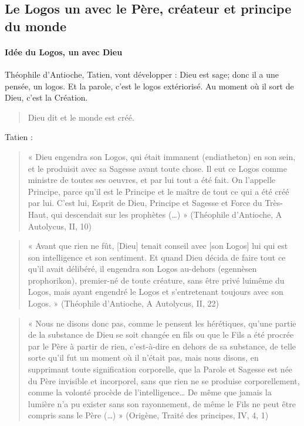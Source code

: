 \subsection{Le Logos un avec le Père, créateur et principe du monde}

 \paragraph{Idée du Logos, un avec Dieu} Théophile d'Antioche, Tatien, vont développer : Dieu est sage; donc il a une pensée, un logos. Et la parole, c'est le logos extériorisé. Au moment où il sort de Dieu, c'est la Création. 
 \begin{quote}
     Dieu dit et le monde est créé.
 \end{quote}

 Tatien : 


\begin{quote}
    « Dieu engendra son Logos, qui était immanent (endiatheton) en son sein, et le produisit avec
sa Sagesse avant toute chose. Il eut ce Logos comme ministre de toutes ses oeuvres, et par lui
tout a été fait. On l’appelle Principe, parce qu’il est le Principe et le maître de tout ce qui a été
créé par lui. C’est lui, Esprit de Dieu, Principe et Sagesse et Force du Très-Haut, qui
descendait sur les prophètes (…) » (Théophile d’Antioche, A Autolycus, II, 10)
\end{quote}


\begin{quote}
    « Avant que rien ne fût, [Dieu] tenait conseil avec [son Logos] lui qui est son intelligence et
son sentiment. Et quand Dieu décida de faire tout ce qu’il avait délibéré, il engendra son
Logos au-dehors (egennèsen prophorikon), premier-né de toute créature, sans être privé luimême
du Logos, mais ayant engendré le Logos et s’entretenant toujours avec son Logos. »
(Théophile d’Antioche, A Autolycus, II, 22)
\end{quote}

 
\begin{quote}
    « Nous ne disons donc pas, comme le pensent les hérétiques, qu’une partie de la substance de
Dieu se soit changée en fils ou que le Fils a été procrée par le Père à partir de rien, c’est-à-dire
en dehors de sa substance, de telle sorte qu’il fut un moment où il n’était pas, mais nous
disons, en supprimant toute signification corporelle, que la Parole et Sagesse est née du Père
invisible et incorporel, sans que rien ne se produise corporellement, comme la volonté
procède de l’intelligence… De même que jamais la lumière n’a pu exister sans son
rayonnement, de même le Fils ne peut être compris sans le Père (…) » (Origène, Traité des
principes, IV, 4, 1)
\end{quote}


